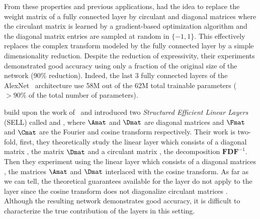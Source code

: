 




From these properties and previous applications, \citet{cheng2015exploration} had the idea to replace the weight matrix of a fully connected layer by circulant and diagonal matrices where the circulant matrix is learned by a gradient-based optimization algorithm and the diagonal matrix entries are sampled at random in $\{-1, 1\}$.
This effectively replaces the complex transform modeled by the fully connected layer by a simple dimensionality reduction.
Despite the reduction of expressivity, their experiments demonstrated good accuracy using only a fraction of the original size of the network (90\% reduction).
Indeed, the last 3 fully connected layers of the AlexNet~\cite{krizhevsky2012imagenet} architecture use 58M out of the 62M total trainable parameters ($> 90\%$ of the total number of parameters).

\citet{moczulski2016acdc} build upon the work of~\citet{cheng2015exploration} and introduced two \emph{Structured Efficient Linear Layers} (SELL) called \AFDF and \ACDC, where $\Amat$ and $\Dmat$ are diagonal matrices and $\Fmat$ and $\Cmat$ are the Fourier and cosine transform respectively.
Their work is two-fold, first, they theoretically study the \AFDF linear layer which consists of a diagonal matrix \eg, the matrix $\Dmat$ and a circulant matrix \eg, the decomposition $\mathbf{FDF}^{-1}$.
Then they experiment using the \ACDC linear layer which consists of a diagonal matrices \eg, the matrices $\Amat$ and $\Dmat$ interlaced with the cosine transform.
As far as we can tell, the theoretical guarantees available for the \AFDF layer do not apply to the \ACDC layer since the cosine transform does not diagonalize circulant matrices \cite{sanchez1995diagonalizing}.
Although the resulting network demonstrates good accuracy, it is difficult to characterize the true contribution of the \ACDC layers in this setting. 

